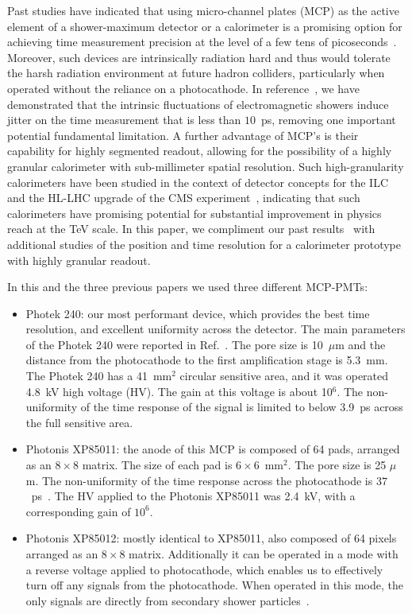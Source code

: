 \documentclass[12pt]{article}
\begin{document}
Past studies have indicated that using micro-channel plates (MCP) as the active
element of a shower-maximum detector or a calorimeter is a promising option for
achieving time measurement precision at the level of a few tens of
picoseconds~\cite{MCPFastCaloNIMA,Ronzhin:2015pba,Ronzhin2015288,Brianza2015216}. 
Moreover, such devices are intrinsically radiation hard and thus would tolerate the harsh
radiation environment at future hadron colliders, particularly when operated 
without the reliance on a photocathode. 
In reference~\cite{Ronzhin2015288}, we have demonstrated that the intrinsic 
fluctuations of electromagnetic showers induce jitter on the time measurement
that is less than $10$~ps, removing one important potential fundamental limitation.
A further advantage of MCP's is their capability for highly segmented readout, allowing for 
the possibility of a highly granular calorimeter with sub-millimeter spatial resolution. Such
high-granularity calorimeters have been studied in the context of detector
concepts for the ILC~\cite{Grondin:2010fe} and the HL-LHC upgrade of the CMS 
experiment~\cite{Butler:2020886}, indicating that such calorimeters have promising 
potential for substantial improvement in physics reach at the TeV scale. In this 
paper, we compliment our past results~\cite{Anderson:2015gha,MCPFastCaloNIMA,Ronzhin:2015pba,Ronzhin2015288} with additional studies of the position and time resolution for a calorimeter prototype with highly granular readout.

In this and the three previous papers we used three different MCP-PMTs:
\begin{itemize}
\item Photek 240: our most performant device, which provides the best
      time resolution, and excellent uniformity across the detector. The main parameters
      of the Photek 240 were reported in Ref.~\cite{MCPFastCaloNIMA}. The pore
      size is 10~$\mu$m and the distance from the photocathode to the first
      amplification stage is 5.3~mm. The Photek 240 has a 41~mm$^2$ circular
      sensitive area, and it was operated 4.8~kV high voltage (HV). The gain at
      this voltage is about 10$^6$. The non-uniformity of the time response of the signal 
      is limited to below 3.9~ps across the full sensitive area.
\item Photonis XP85011: the anode of this MCP is composed of 64 pads, arranged
      as an $8\times8$ matrix. The size of each pad is $6\times6$~$\mathrm{mm}^{2}$. 
      The pore size is 25 $\mu$m. The non-uniformity  of the time response across the photocathode
      is $37$~ps~\cite{MCPFastCaloNIMA, Ronzhin2015288}. The HV applied to the Photonis XP85011 
      was 2.4~kV, with a corresponding gain of $10^6$. 
\item Photonis XP85012: mostly identical to XP85011, also composed of 64 pixels arranged as
      an $8\times8$ matrix. Additionally it can be operated in a mode with a reverse voltage applied 
      to photocathode, which enables us to effectively turn off any signals from 
      the photocathode. When operated in this mode, the only signals are 
      directly from secondary shower particles~\cite{Ronzhin:2015pba}.  
\end{itemize}
\end{document}

